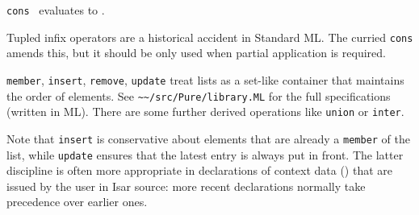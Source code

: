 \begin{isabellebody}
\begin{isamarkuptext}
  \begin{description}

  \item \verb|cons|~ evaluates to .

  Tupled infix operators are a historical accident in Standard ML.
  The curried \verb|cons| amends this, but it should be only used when
  partial application is required.

  \item \verb|member|, \verb|insert|, \verb|remove|, \verb|update| treat
  lists as a set-like container that maintains the order of elements.
  See \verb|~~/src/Pure/library.ML| for the full specifications
  (written in ML).  There are some further derived operations like
  \verb|union| or \verb|inter|.

  Note that \verb|insert| is conservative about elements that are
  already a \verb|member| of the list, while \verb|update| ensures that
  the latest entry is always put in front.  The latter discipline is
  often more appropriate in declarations of context data
  () that are issued by the user in Isar
  source: more recent declarations normally take precedence over
  earlier ones.


\end{description}
\end{isamarkuptext}
\end{isabellebody}
